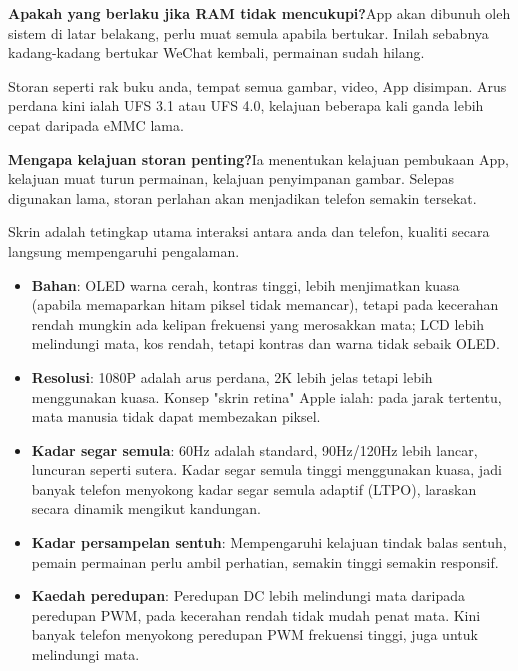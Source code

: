 \textbf{Apakah yang berlaku jika RAM tidak mencukupi?}App akan dibunuh oleh sistem di latar belakang, perlu muat semula apabila bertukar. Inilah sebabnya kadang-kadang bertukar WeChat kembali, permainan sudah hilang.


Storan seperti rak buku anda, tempat semua gambar, video, App disimpan. Arus perdana kini ialah UFS 3.1 atau UFS 4.0, kelajuan beberapa kali ganda lebih cepat daripada eMMC lama.

\textbf{Mengapa kelajuan storan penting?}Ia menentukan kelajuan pembukaan App, kelajuan muat turun permainan, kelajuan penyimpanan gambar. Selepas digunakan lama, storan perlahan akan menjadikan telefon semakin tersekat.


Skrin adalah tetingkap utama interaksi antara anda dan telefon, kualiti secara langsung mempengaruhi pengalaman.

\begin{itemize}
  \item \textbf{Bahan}: OLED warna cerah, kontras tinggi, lebih menjimatkan kuasa (apabila memaparkan hitam piksel tidak memancar), tetapi pada kecerahan rendah mungkin ada kelipan frekuensi yang merosakkan mata; LCD lebih melindungi mata, kos rendah, tetapi kontras dan warna tidak sebaik OLED.
  \item \textbf{Resolusi}: 1080P adalah arus perdana, 2K lebih jelas tetapi lebih menggunakan kuasa. Konsep "skrin retina" Apple ialah: pada jarak tertentu, mata manusia tidak dapat membezakan piksel.
  \item \textbf{Kadar segar semula}: 60Hz adalah standard, 90Hz/120Hz lebih lancar, luncuran seperti sutera. Kadar segar semula tinggi menggunakan kuasa, jadi banyak telefon menyokong kadar segar semula adaptif (LTPO), laraskan secara dinamik mengikut kandungan.
  \item \textbf{Kadar persampelan sentuh}: Mempengaruhi kelajuan tindak balas sentuh, pemain permainan perlu ambil perhatian, semakin tinggi semakin responsif.
  \item \textbf{Kaedah peredupan}: Peredupan DC lebih melindungi mata daripada peredupan PWM, pada kecerahan rendah tidak mudah penat mata. Kini banyak telefon menyokong peredupan PWM frekuensi tinggi, juga untuk melindungi mata.
\end{itemize}



